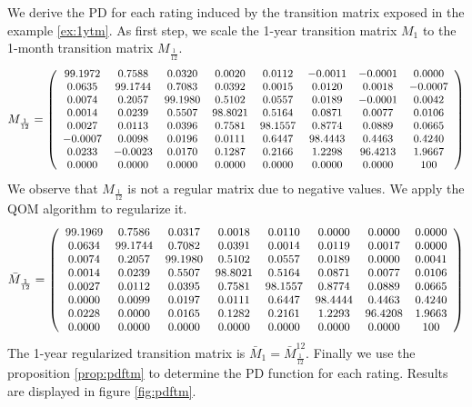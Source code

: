 \documentclass[11pt,fleqn]{book} %
\begin{document}
\begin{example}
	\label{ex:pdftm}
	We derive the PD for each rating induced by the transition matrix exposed
	in the example \ref{ex:1ytm}. As first step, we scale the 1-year transition 
	matrix $M_1$ to the 1-month transition matrix $M_{\frac{1}{12}}$.
	\begin{displaymath}
		M_{\frac{1}{12}} = \left(
		\small
		\begin{array}{cccccccc}
			99.1972 &  0.7588 &  0.0320 &  0.0020 &  0.0112 & -0.0011 & -0.0001 &   0.0000 \\
			 0.0635 & 99.1744 &  0.7083 &  0.0392 &  0.0015 &  0.0120 &  0.0018 &  -0.0007 \\
			 0.0074 &  0.2057 & 99.1980 &  0.5102 &  0.0557 &  0.0189 & -0.0001 &   0.0042 \\
			 0.0014 &  0.0239 &  0.5507 & 98.8021 &  0.5164 &  0.0871 &  0.0077 &   0.0106 \\
			 0.0027 &  0.0113 &  0.0396 &  0.7581 & 98.1557 &  0.8774 &  0.0889 &   0.0665 \\
			-0.0007 &  0.0098 &  0.0196 &  0.0111 &  0.6447 & 98.4443 &  0.4463 &   0.4240 \\
			 0.0233 & -0.0023 &  0.0170 &  0.1287 &  0.2166 &  1.2298 & 96.4213 &   1.9667 \\
			 0.0000 &  0.0000 &  0.0000 &  0.0000 &  0.0000 &  0.0000 &  0.0000 & 100 \\
		\end{array}
		\right)
	\end{displaymath}
	We observe that $M_{\frac{1}{12}}$ is not a regular matrix due to negative
	values. We apply the QOM algorithm to regularize it.
	\begin{displaymath}
		\bar{M}_{\frac{1}{12}} = \left(
		\small
		\begin{array}{cccccccc}
			99.1969 &  0.7586 &  0.0317 &  0.0018 &  0.0110 &  0.0000 &  0.0000 &   0.0000 \\
			 0.0634 & 99.1744 &  0.7082 &  0.0391 &  0.0014 &  0.0119 &  0.0017 &   0.0000 \\
			 0.0074 &  0.2057 & 99.1980 &  0.5102 &  0.0557 &  0.0189 &  0.0000 &   0.0041 \\
			 0.0014 &  0.0239 &  0.5507 & 98.8021 &  0.5164 &  0.0871 &  0.0077 &   0.0106 \\
			 0.0027 &  0.0112 &  0.0395 &  0.7581 & 98.1557 &  0.8774 &  0.0889 &   0.0665 \\
			 0.0000 &  0.0099 &  0.0197 &  0.0111 &  0.6447 & 98.4444 &  0.4463 &   0.4240 \\
			 0.0228 &  0.0000 &  0.0165 &  0.1282 &  0.2161 &  1.2293 & 96.4208 &   1.9663 \\
			 0.0000 &  0.0000 &  0.0000 &  0.0000 &  0.0000 &  0.0000 &  0.0000 & 100 \\
		\end{array}
		\right)
	\end{displaymath}
	The 1-year regularized transition matrix is $\bar{M}_1 = \bar{M}_{\frac{1}{12}}^{12}$.
	Finally we use the proposition \ref{prop:pdftm} to determine the 
	PD function for each rating. Results are displayed in figure 
	\ref{fig:pdftm}.
\end{example}
\end{document}
